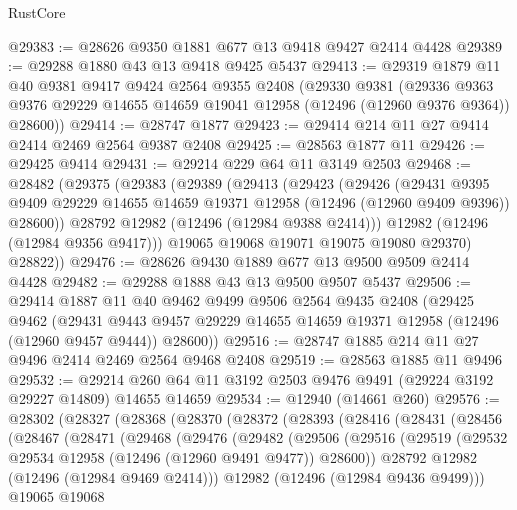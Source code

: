 \begin{lexlean}{RustCore}
\begin{coremodule}
@29383 := @28626 @9350 @1881 @677 @13 @9418 @9427 @2414 @4428
@29389 := @29288 @1880 @43 @13 @9418 @9425 @5437
@29413 := @29319
    @1879
    @11
    @40
    @9381
    @9417
    @9424
    @2564
    @9355
    @2408
    (@29330
      @9381
      (@29336 @9363 @9376 @29229 @14655 @14659 @19041 @12958 (@12496 (@12960 @9376 @9364)) @28600))
@29414 := @28747 @1877
@29423 := @29414 @214 @11 @27 @9414 @2414 @2469 @2564 @9387 @2408
@29425 := @28563 @1877 @11
@29426 := @29425 @9414
@29431 := @29214 @229 @64 @11 @3149 @2503
@29468 := @28482
    (@29375
      (@29383
        (@29389
          (@29413
            (@29423
              (@29426
                (@29431
                  @9395
                  @9409
                  @29229
                  @14655
                  @14659
                  @19371
                  @12958
                  (@12496 (@12960 @9409 @9396))
                  @28600))
              @28792
              @12982
              (@12496 (@12984 @9388 @2414)))
            @12982
            (@12496 (@12984 @9356 @9417)))
          @19065
          @19068
          @19071
          @19075
          @19080
          @29370)
        @28822))
@29476 := @28626 @9430 @1889 @677 @13 @9500 @9509 @2414 @4428
@29482 := @29288 @1888 @43 @13 @9500 @9507 @5437
@29506 := @29414
    @1887
    @11
    @40
    @9462
    @9499
    @9506
    @2564
    @9435
    @2408
    (@29425
      @9462
      (@29431 @9443 @9457 @29229 @14655 @14659 @19371 @12958 (@12496 (@12960 @9457 @9444)) @28600))
@29516 := @28747 @1885 @214 @11 @27 @9496 @2414 @2469 @2564 @9468 @2408
@29519 := @28563 @1885 @11 @9496
@29532 := @29214 @260 @64 @11 @3192 @2503 @9476 @9491 (@29224 @3192 @29227 @14809) @14655 @14659
@29534 := @12940 (@14661 @260)
@29576 := @28302
    (@28327
      (@28368
        (@28370
          (@28372
            (@28393
              (@28416
                (@28431
                  (@28456
                    (@28467
                      (@28471
                        (@29468
                          (@29476
                            (@29482
                              (@29506
                                (@29516
                                  (@29519
                                    (@29532 @29534 @12958 (@12496 (@12960 @9491 @9477)) @28600))
                                  @28792
                                  @12982
                                  (@12496 (@12984 @9469 @2414)))
                                @12982
                                (@12496 (@12984 @9436 @9499)))
                              @19065
                              @19068

\end{coremodule}
\end{lexlean}
